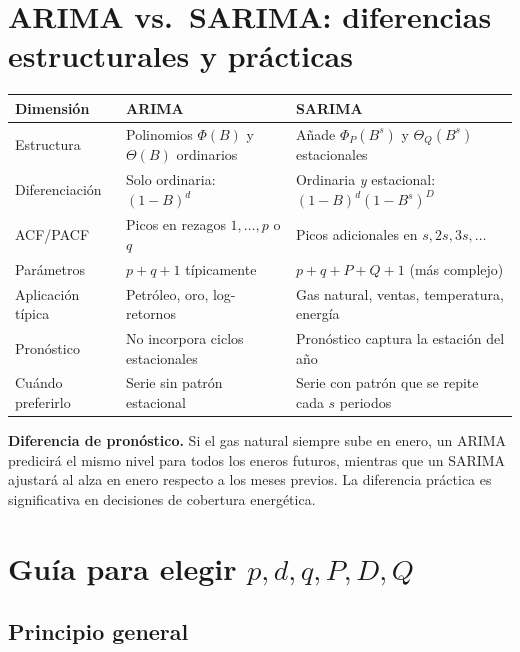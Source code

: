 \documentclass[12pt,a4paper]{article}
\theoremstyle{definition}
\begin{document}
\section{ARIMA vs.\ SARIMA: diferencias estructurales y prácticas}

\begin{center}
\renewcommand{\arraystretch}{1.3}
\begin{tabular}{p{3.5cm}p{5cm}p{5cm}}
\toprule
\textbf{Dimensión} & \textbf{ARIMA} & \textbf{SARIMA} \\
\midrule
Estructura & Polinomios $\Phi(B)$ y $\Theta(B)$ ordinarios & Añade $\Phi_P(B^s)$ y $\Theta_Q(B^s)$ estacionales \\
\midrule
Diferenciación & Solo ordinaria: $(1-B)^d$ & Ordinaria \emph{y} estacional: $(1-B)^d(1-B^s)^D$ \\
\midrule
ACF/PACF & Picos en rezagos $1,\ldots,p$ o $q$ & Picos adicionales en $s, 2s, 3s, \ldots$ \\
\midrule
Parámetros & $p+q+1$ típicamente & $p+q+P+Q+1$ (más complejo) \\
\midrule
Aplicación típica & Petróleo, oro, log-retornos & Gas natural, ventas, temperatura, energía \\
\midrule
Pronóstico & No incorpora ciclos estacionales & Pronóstico captura la estación del año \\
\midrule
Cuándo preferirlo & Serie sin patrón estacional & Serie con patrón que se repite cada $s$ periodos \\
\bottomrule
\end{tabular}
\end{center}

\medskip
\noindent\textbf{Diferencia de pronóstico.} Si el gas natural siempre sube en
enero, un ARIMA predicirá el mismo nivel para todos los eneros futuros,
mientras que un SARIMA ajustará al alza en enero respecto a los meses previos.
La diferencia práctica es significativa en decisiones de cobertura energética.

\section{Guía para elegir $p,d,q,P,D,Q$}

\subsection{Principio general}
\end{document}
